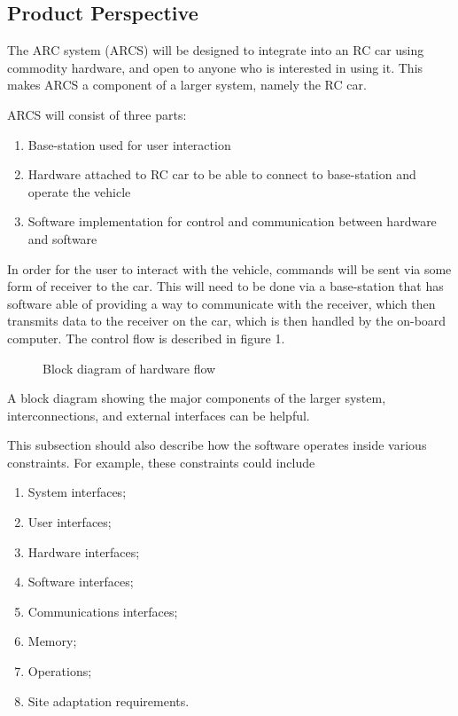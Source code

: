 \documentclass[draftclsnofoot,onecolumn,10pt]{IEEEtran}
\begin{document}
\subsection{Product Perspective} %
The ARC system (ARCS) will be designed to integrate into an RC car using 
commodity hardware, and open to anyone who is interested in using it. This 
makes ARCS a component of a larger system, namely the RC car. \par
ARCS will consist of three parts: 
\begin{enumerate}
	\item Base-station used for user interaction
	\item Hardware attached to RC car to be able to connect to base-station and 
		operate the vehicle
	\item Software implementation for control and communication between hardware and 		software
\end{enumerate}
In order for the user to interact with the vehicle, commands will be sent via some form
of receiver to the car. This will need to be done via a base-station that has software able of
providing a way to communicate with the receiver, which then transmits data to the receiver on the car, which is then handled by the on-board computer. 
The control flow is described in figure 1. \\


\begin{figure}
  \centering
  \vspace{10cm}
  \caption{Block diagram of hardware flow}
\end{figure}


A block diagram showing the major components of the larger system,
interconnections, and external interfaces can be helpful.

This subsection should also describe how the software operates inside various
constraints. For example, these constraints could include
\begin{enumerate}
	\item System interfaces;
	\item User interfaces;
	\item Hardware interfaces;
	\item Software interfaces;
	\item Communications interfaces;
	\item Memory;
	\item Operations;
	\item Site adaptation requirements.
\end{enumerate}
\end{document}
